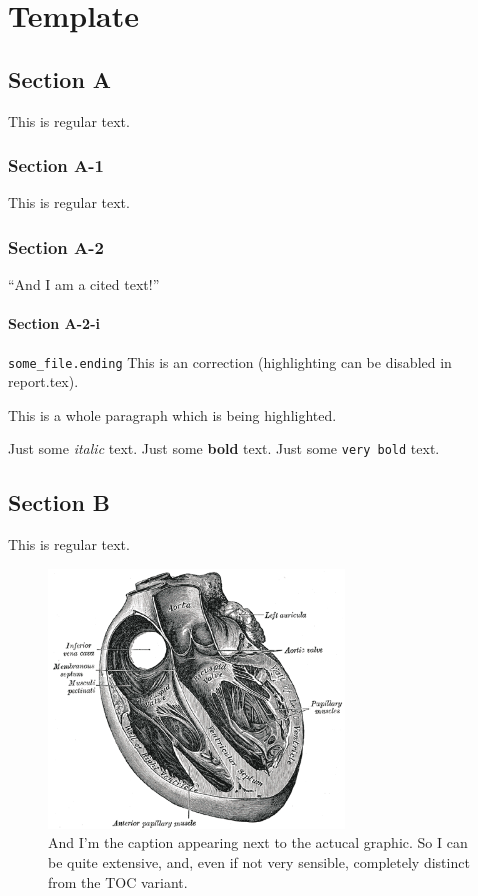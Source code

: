 \chapter{Template}\label{ch:template}


\section{Section A}%
This is regular text.

\subsection{Section A-1}
This is regular text.\cite{DINBEISPIEL}

\subsection{Section A-2}
\enquote{And I am a cited text!}\parencite[vgl.][S. 152]{sousa_new_2005}

\subsubsection{Section A-2-i}
\verb|some_file.ending|
This is an  correction (highlighting can be disabled in report.tex).

\begin{mccorrection}
    This is a whole paragraph which is being highlighted.
\end{mccorrection}

Just some \textit{italic} text.
Just some \textbf{bold} text.
Just some \texttt{very bold} text.

\section{Section B}%
This is regular text.

\begin{figure}
    \centering
    \includegraphics[width=0.7\textwidth]{content/figures/sample/Gray498}
    \caption[I'm the short title for the TOC]{And I'm the caption appearing next to the actucal graphic. So I can be quite extensive, and, even if not very sensible, completely distinct from the TOC variant.}
    \label{fig:heart}
\end{figure}

